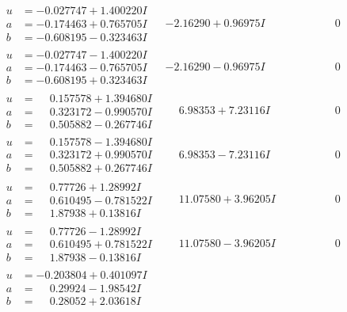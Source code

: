 \documentclass[1p]{elsarticle_modified}
\theoremstyle{definition}
\begin{document}
$$\begin{array}{c|c|c}
\begin{aligned}
u &= -0.027747 + 1.400220 I \\
a &= -0.174463 + 0.765705 I \\
b &= -0.608195 - 0.323463 I\end{aligned}
 & -2.16290 + 0.96975 I & \phantom{-0.000000 } 0 \\ \hline\begin{aligned}
u &= -0.027747 - 1.400220 I \\
a &= -0.174463 - 0.765705 I \\
b &= -0.608195 + 0.323463 I\end{aligned}
 & -2.16290 - 0.96975 I & \phantom{-0.000000 } 0 \\ \hline\begin{aligned}
u &= \phantom{-}0.157578 + 1.394680 I \\
a &= \phantom{-}0.323172 - 0.990570 I \\
b &= \phantom{-}0.505882 - 0.267746 I\end{aligned}
 & \phantom{-}6.98353 + 7.23116 I & \phantom{-0.000000 } 0 \\ \hline\begin{aligned}
u &= \phantom{-}0.157578 - 1.394680 I \\
a &= \phantom{-}0.323172 + 0.990570 I \\
b &= \phantom{-}0.505882 + 0.267746 I\end{aligned}
 & \phantom{-}6.98353 - 7.23116 I & \phantom{-0.000000 } 0 \\ \hline\begin{aligned}
u &= \phantom{-}0.77726 + 1.28992 I \\
a &= \phantom{-}0.610495 - 0.781522 I \\
b &= \phantom{-}1.87938 + 0.13816 I\end{aligned}
 & \phantom{-}11.07580 + 3.96205 I & \phantom{-0.000000 } 0 \\ \hline\begin{aligned}
u &= \phantom{-}0.77726 - 1.28992 I \\
a &= \phantom{-}0.610495 + 0.781522 I \\
b &= \phantom{-}1.87938 - 0.13816 I\end{aligned}
 & \phantom{-}11.07580 - 3.96205 I & \phantom{-0.000000 } 0 \\ \hline\begin{aligned}
u &= -0.203804 + 0.401097 I \\
a &= \phantom{-}0.29924 - 1.98542 I \\
b &= \phantom{-}0.28052 + 2.03618 I\end{aligned}

\end{array}$$
\end{document}
